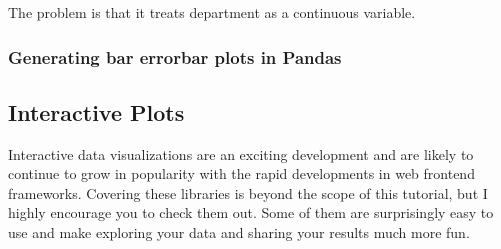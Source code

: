 \documentclass[letterpaper,10pt,english]{sphinxmanual}
\begin{document}
\noindent{}

The problem is that it treats department as a continuous variable.


\subsubsection{Generating bar \sphinxhyphen{} errorbar plots in Pandas}
\label{\detokenize{content/Introduction_to_Plotting:generating-bar-errorbar-plots-in-pandas}}
\begin{sphinxVerbatim}[commandchars=\\\{\}]
  \PYG{p}{[}\PYG{p}{]}
  \PYG{p}{[}\PYG{p}{]}  \PYG{p}{[}\PYG{p}{]}
  
\end{sphinxVerbatim}

\noindent{}


\subsection{Interactive Plots}
\label{\detokenize{content/Introduction_to_Plotting:interactive-plots}}
Interactive data visualizations are an exciting development and are likely to continue to grow in popularity with the rapid developments in web frontend frameworks. Covering these libraries is beyond the scope of this tutorial, but I highly encourage you to check them out. Some of them are surprisingly easy to use and make exploring your data and sharing your results much more fun.
\end{document}
